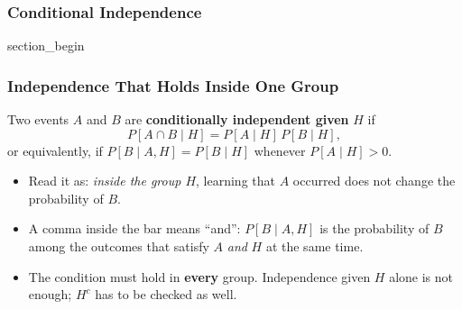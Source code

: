 \subsubsection{Conditional Independence}
\begin{frame} \vfill \centering \begin{beamercolorbox}[sep=10pt,center,shadow=false,rounded=true]{section_begin} \insertsubsubsectionhead\par \end{beamercolorbox} \vfill \end{frame}

\begin{frame}[t]
\frametitle{Independence That Holds Inside One Group}
\vspace{1mm}
\footnotesize
\begin{Definisi}
    Two events $A$ and $B$ are \textbf{conditionally independent given} $H$ if
    \[ P[A \cap B \mid H] = P[A \mid H]\, P[B \mid H], \]
    or equivalently, if $P[B \mid A, H] = P[B \mid H]$ whenever $P[A \mid H] > 0$.
\end{Definisi}
\vspace{-2mm}
\begin{itemize}\setlength\itemsep{2pt}
    \item Read it as: \emph{inside the group $H$}, learning that $A$ occurred does not change the probability of $B$.
    \item A comma inside the bar means ``and'': $P[B \mid A, H]$ is the probability of $B$ among the outcomes that satisfy $A$ \emph{and} $H$ at the same time.
    \item The condition must hold in \textbf{every} group. Independence given $H$ alone is not enough; $H^c$ has to be checked as well.
\end{itemize}
\end{frame}

